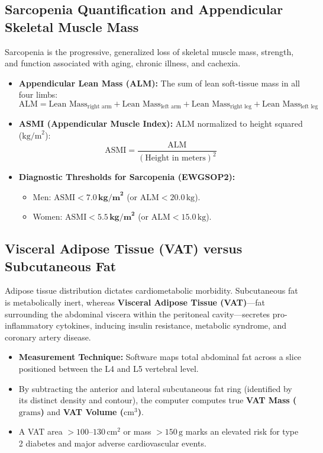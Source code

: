 \documentclass[11pt,a4paper]{article}
\begin{document}
\subsection{Sarcopenia Quantification and Appendicular Skeletal Muscle Mass}

Sarcopenia is the progressive, generalized loss of skeletal muscle mass, strength, and function associated with aging, chronic illness, and cachexia.
\begin{itemize}[leftmargin=*]
    \item \textbf{Appendicular Lean Mass (ALM):} The sum of lean soft-tissue mass in all four limbs:
    \begin{equation}
        \text{ALM} = \text{Lean Mass}_{\text{right arm}} + \text{Lean Mass}_{\text{left arm}} + \text{Lean Mass}_{\text{right leg}} + \text{Lean Mass}_{\text{left leg}}
    \end{equation}
    \item \textbf{ASMI (Appendicular Muscle Index):} ALM normalized to height squared ($\text{kg/m}^2$):
    \begin{equation}
        \text{ASMI} = \frac{\text{ALM}}{(\text{Height in meters})^2}
    \end{equation}
    \item \textbf{Diagnostic Thresholds for Sarcopenia (EWGSOP2):}
    \begin{itemize}
        \item Men: $\text{ASMI} < \mathbf{7.0\,\text{kg/m}^2}$ (or $\text{ALM} < 20.0\,\text{kg}$).
        \item Women: $\text{ASMI} < \mathbf{5.5\,\text{kg/m}^2}$ (or $\text{ALM} < 15.0\,\text{kg}$).
    \end{itemize}
\end{itemize}

\subsection{Visceral Adipose Tissue (VAT) versus Subcutaneous Fat}

Adipose tissue distribution dictates cardiometabolic morbidity. Subcutaneous fat is metabolically inert, whereas \textbf{Visceral Adipose Tissue (VAT)}—fat surrounding the abdominal viscera within the peritoneal cavity—secretes pro-inflammatory cytokines, inducing insulin resistance, metabolic syndrome, and coronary artery disease.
\begin{itemize}[leftmargin=*]
    \item \textbf{Measurement Technique:} Software maps total abdominal fat across a slice positioned between the L4 and L5 vertebral level.
    \item By subtracting the anterior and lateral subcutaneous fat ring (identified by its distinct density and contour), the computer computes true \textbf{VAT Mass ($\text{grams}$)} and \textbf{VAT Volume ($\text{cm}^3$)}.
    \item A VAT area $> 100\text{--}130\,\text{cm}^2$ or mass $> 150\,\text{g}$ marks an elevated risk for type 2 diabetes and major adverse cardiovascular events.
\end{itemize}
\end{document}

